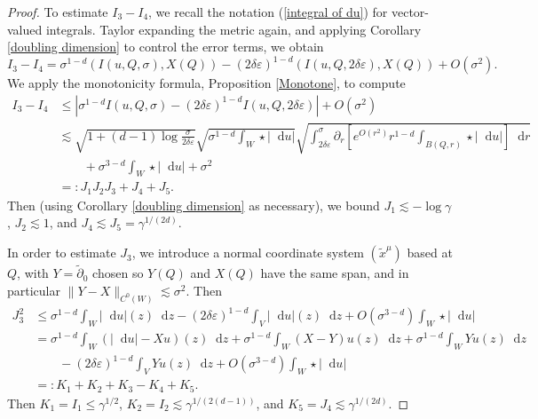 \documentclass[reqno,11pt]{amsart}
\newcommand*\dif{\mathop{}\!\mathrm{d}}
\theoremstyle{definition}
\numberwithin{equation}{section}
\begin{document}
\begin{proof}
To estimate $I_3 - I_4$, we recall the notation (\ref{integral of du}) for vector-valued integrals.
Taylor expanding the metric again, and applying Corollary \ref{doubling dimension} to control the error terms, we obtain 
$$I_3 - I_4 = \sigma^{1 - d} (I(u, Q, \sigma), X(Q)) - (2 \delta \varepsilon)^{1 - d} (I(u, Q, 2\delta\varepsilon), X(Q)) + O(\sigma^2).$$
We apply the monotonicity formula, Proposition \ref{Monotone}, to compute
\begin{align*}
    I_3 - I_4 & \leq |\sigma^{1 - d} I(u, Q, \sigma) - (2 \delta \varepsilon)^{1 - d} I(u, Q, 2 \delta \varepsilon)| + O(\sigma^2) \\
    &\lesssim \sqrt{1 + (d - 1) \log \frac{\sigma}{2\delta\varepsilon}} \sqrt{\sigma^{1 - d} \int_W \star |\dif u|} \sqrt{\int_{2\delta\varepsilon}^\sigma \partial_r \left[e^{O(r^2)} r^{1 - d} \int_{B(Q, r)} \star |\dif u|\right] \dif r}\\
&\qquad + \sigma^{3 - d} \int_W \star |\dif u| + \sigma^2 \\
&=: J_1 J_2 J_3 + J_4 + J_5.
\end{align*}
Then (using Corollary \ref{doubling dimension} as necessary), we bound $J_1 \lesssim -\log \gamma$, $J_2 \lesssim 1$, and $J_4 \lesssim J_5 = \gamma^{1/(2d)}$.

In order to estimate $J_3$, we introduce a normal coordinate system $(\tilde x^\mu)$ based at $Q$, with $Y = \tilde \partial_0$ chosen so $Y(Q)$ and $X(Q)$ have the same span, and in particular $\|Y - X\|_{C^0(W)} \lesssim \sigma^2$.
Then
\begin{align*}
J_3^2 &\leq \sigma^{1 - d} \int_W |\dif u|(z) \dif z - (2 \delta \varepsilon)^{1 - d} \int_V |\dif u|(z) \dif z + O(\sigma^{3 - d}) \int_W \star |\dif u| \\
&= \sigma^{1 - d} \int_W (|\dif u| - Xu)(z) \dif z + \sigma^{1 - d} \int_W (X - Y)u(z) \dif z + \sigma^{1 - d} \int_W Yu(z) \dif z \\
  &\qquad - (2 \delta\varepsilon)^{1 - d} \int_V Y u(z) \dif z + O(\sigma^{3 - d}) \int_W \star |\dif u| \\
&=: K_1 + K_2 + K_3 - K_4 + K_5.
\end{align*}
Then $K_1 = I_1 \leq \gamma^{1/2}$, $K_2 = I_2 \lesssim \gamma^{1/(2(d - 1))}$, and $K_5 = J_4 \lesssim \gamma^{1/(2d)}$.


\end{proof}
\end{document}

